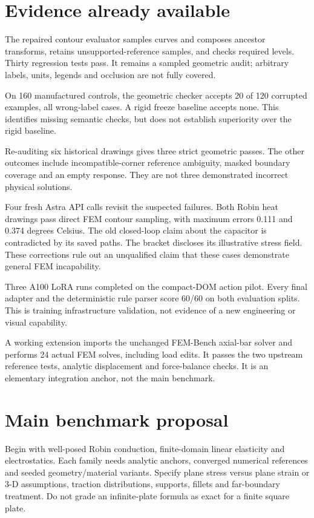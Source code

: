 \documentclass[
  11pt,
  a4paper,
]{article}
\newcounter{none} %
\begin{document}
\section{Evidence already available}\label{evidence-already-available}

The repaired contour evaluator samples curves and composes ancestor
transforms, retains unsupported-reference samples, and checks required
levels. Thirty regression tests pass. It remains a sampled geometric
audit; arbitrary labels, units, legends and occlusion are not fully
covered.

On 160 manufactured controls, the geometric checker accepts 20 of 120
corrupted examples, all wrong-label cases. A rigid freeze baseline
accepts none. This identifies missing semantic checks, but does not
establish superiority over the rigid baseline.

Re-auditing six historical drawings gives three strict geometric passes.
The other outcomes include incompatible-corner reference ambiguity,
masked boundary coverage and an empty response. They are not three
demonstrated incorrect physical solutions.

Four fresh Astra API calls revisit the suspected failures. Both Robin
heat drawings pass direct FEM contour sampling, with maximum errors
0.111 and 0.374 degrees Celsius. The old closed-loop claim about the
capacitor is contradicted by its saved paths. The bracket discloses its
illustrative stress field. These corrections rule out an unqualified
claim that these cases demonstrate general FEM incapability.

Three A100 LoRA runs completed on the compact-DOM action pilot. Every
final adapter and the deterministic rule parser score 60/60 on both
evaluation splits. This is training infrastructure validation, not
evidence of a new engineering or visual capability.

A working extension imports the unchanged FEM-Bench axial-bar solver and
performs 24 actual FEM solves, including load edits. It passes the two
upstream reference tests, analytic displacement and force-balance
checks. It is an elementary integration anchor, not the main benchmark.

\section{Main benchmark proposal}\label{main-benchmark-proposal}

Begin with well-posed Robin conduction, finite-domain linear elasticity
and electrostatics. Each family needs analytic anchors, converged
numerical references and seeded geometry/material variants. Specify
plane stress versus plane strain or 3-D assumptions, traction
distributions, supports, fillets and far-boundary treatment. Do not
grade an infinite-plate formula as exact for a finite square plate.
\end{document}
